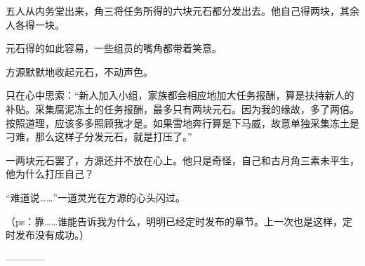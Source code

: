 \begin{this_body}
五人从内务堂出来，角三将任务所得的六块元石都分发出去。他自己得两块，其余人各得一块。

元石得的如此容易，一些组员的嘴角都带着笑意。

方源默默地收起元石，不动声色。

只在心中思索：“新人加入小组，家族都会相应地加大任务报酬，算是扶持新人的补贴。采集腐泥冻土的任务报酬，最多只有两块元石。因为我的缘故，多了两倍。按照道理，应该多多照顾我才是。如果雪地奔行算是下马威，故意单独采集冻土是刁难，那么这样子分发元石，就是打压了。”

一两块元石罢了，方源还并不放在心上。他只是奇怪，自己和古月角三素未平生，他为什么打压自己？

“难道说……”一道灵光在方源的心头闪过。

（ps：靠……谁能告诉我为什么，明明已经定时发布的章节。上一次也是这样，定时发布没有成功。）

------------

\end{this_body}

